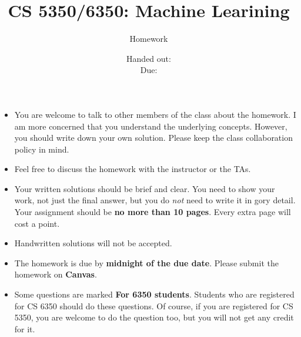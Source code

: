\documentclass[12pt, fullpage,letterpaper]{article}
\title{CS 5350/6350: Machine Learining \semester}
\author{Homework \assignmentId}
\date{Handed out: \releaseDate\\
  Due: \dueDate}
\begin{document}
\maketitle


\footnotesize
	\begin{itemize}
		\item You are welcome to talk to other members of the class about
		the homework. I am more concerned that you understand the
		underlying concepts. However, you should write down your own
		solution. Please keep the class collaboration policy in mind.
		
		\item Feel free to discuss the homework with the instructor or the TAs.
		
		\item Your written solutions should be brief and clear. You need to
		show your work, not just the final answer, but you do \emph{not}
		need to write it in gory detail. Your assignment should be {\bf no
			more than 10 pages}. Every extra page will cost a point.
		
		\item Handwritten solutions will not be accepted.
		
		\item The homework is due by \textbf{midnight of the due date}. Please submit
		the homework on \textbf{Canvas}.
		
		\item Some questions are marked {\bf For 6350 students}. Students
		who are registered for CS 6350 should do these questions. Of
		course, if you are registered for CS 5350, you are welcome to do
		the question too, but you will not get any credit for it.
		
	\end{itemize}
\end{document}
